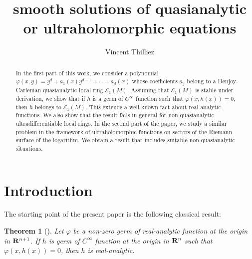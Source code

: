\documentclass[a4paper]{amsart}
\title[smooth solutions of quasianalytic or ultraholomorphic equations]{smooth solutions of quasianalytic or ultraholomorphic equations}
\author{Vincent Thilliez}
\theoremstyle{plain}
\newtheorem{thm}{Theorem}
\theoremstyle{remark}
\begin{document}
\begin{abstract} In the first part of this work, we consider a polynomial 
$ \varphi(x,y)=y^d+a_1(x)y^{d-1}+\cdots+a_d(x) $
whose coefficients  $ a_j $ belong to a Denjoy-Carleman quasianalytic local ring $ \mathcal{E}_1(M) $. Assuming that $ \mathcal{E}_1(M) $ is stable under derivation, we show that if $ h $ is a germ of $ C^\infty $ function such that $ \varphi(x,h(x))=0 $, then $ h $ belongs to $ \mathcal{E}_1(M) $. This extends a well-known fact about real-analytic functions. We also show that the result fails in general for non-quasianalytic ultradifferentiable local rings. In the second part of the paper, we study a similar problem in the framework of ultraholomorphic functions on sectors of the Riemann surface of the logarithm. We obtain a result that includes suitable non-quasianalytic situations. 
\end{abstract}

\maketitle

\section*{Introduction}

The starting point of the present paper is the following classical result:

\begin{thm}[\cite{M, Sic}]\label{classic}
Let $ \varphi $ be a non-zero germ of real-analytic function at the origin in $ {\bf R}^{n+1} $. If $ h $ is germ of $ C^\infty $ function at the origin in $ {\bf R}^n $ such that $ \varphi(x,h(x))=0 $, then $ h $ is real-analytic. 
\end{thm}
\end{document}

